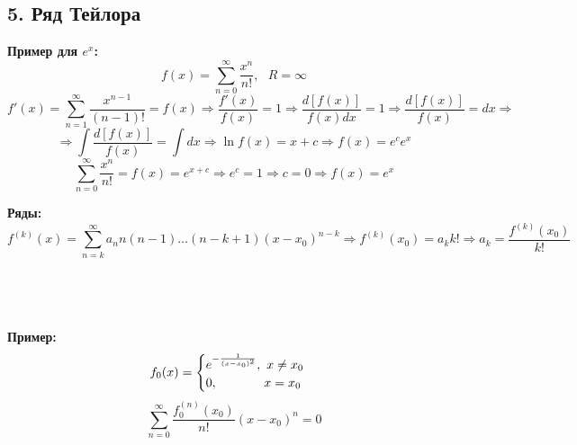 \documentclass[book, 11pt]{report}
\begin{document}
        \subsection*{5. Ряд Тейлора}
        \par{\textbf{Пример для $e^x$:}\\
        \begin{equation*}
            f(x)=\sum_{n=0}^{\infty}\frac{x^n}{n!}, \ \ \ R=\infty
        \end{equation*}
        \begin{equation*}
            f'(x)=\sum_{n=1}^{\infty}\frac{x^{n-1}}{(n-1)!}=f(x)\Rightarrow\frac{f'(x)}{f(x)}=1\Rightarrow\frac{d[f(x)]}{f(x)dx}=1\Rightarrow\frac{d[f(x)]}{f(x)}=dx\Rightarrow
        \end{equation*}
        \begin{equation*}
            \Rightarrow\int\frac{d[f(x)]}{f(x)}=\int dx\Rightarrow \ln{f(x)}=x+c\Rightarrow f(x)=e^ce^x
        \end{equation*}
        \begin{equation*}
            \sum_{n=0}^{\infty}\frac{x^n}{n!}=f(x)=e^{x+c}\Rightarrow e^c=1\Rightarrow c=0\Rightarrow f(x)=e^x
        \end{equation*}
        }
        \newpage
        \par{\textbf{Ряды: }\\
        \begin{equation*}
            f^{(k)}(x)=\sum_{n=k}^{\infty}a_nn(n-1)\ldots(n-k+1)(x-x_0)^{n-k}\Rightarrow f^{(k)}(x_0)=a_kk!\Rightarrow a_k=\frac{f^{(k)}(x_0)}{k!}
        \end{equation*}
        \\
        \\
        \\
        \\
        \textbf{Пример:}
        \begin{equation*}
            f_0(x)=\begin{cases}
                {\large e^{-\frac{1}{(x-x_0)^2}}},  \ x\ne x_0\\
                0, \ \ \ \ \ \ \ \ \ \ \ x=x_0
            \end{cases}
        \end{equation*}
        \begin{equation*}
            \sum_{n=0}^{\infty}\frac{f_0^{(n)}(x_0)}{n!}(x-x_0)^n=0
        \end{equation*}
        }
\end{document}
